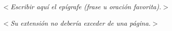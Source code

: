 \thispagestyle{empty}
\null\vfill
\begin{flushright}

$<${\large \textit{Escribir aquí el epígrafe (frase u oración favorita).}}$>$

$<${\large \textit{Su extensión no debería exceder de una página.}}$>$

\end{flushright}
